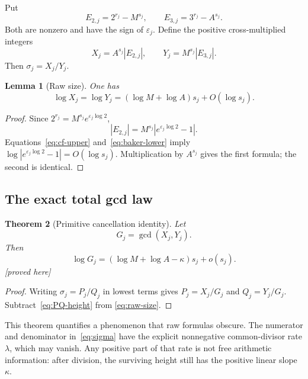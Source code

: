 \documentclass[11pt,oneside]{article}
\newtheorem{theorem}{Theorem}[section]
\newtheorem{lemma}[theorem]{Lemma}
\theoremstyle{definition}
\theoremstyle{remark}
\newcommand{\eps}{\varepsilon}
\newcommand{\proved}{\textcolor{deepgreen}{\textsf{[proved here]}}}
\begin{document}
Put
\begin{equation}
 E_{2,j}=2^{r_j}-M^{s_j},\qquad
 E_{3,j}=3^{r_j}-A^{s_j}.
 \label{eq:residuals}
\end{equation}
Both are nonzero and have the sign of $\eps_j$.  Define the positive cross-multiplied
integers
\begin{equation}
 X_j=A^{s_j}|E_{2,j}|,
 \qquad
 Y_j=M^{s_j}|E_{3,j}|.
 \label{eq:XY}
\end{equation}
Then $\sigma_j=X_j/Y_j$.

\begin{lemma}[Raw size]
\label{lem:raw-size}
One has
\begin{equation}
 \log X_j=\log Y_j=(\log M+\log A)s_j+O(\log s_j).
 \label{eq:raw-size}
\end{equation}
\end{lemma}

\begin{proof}
Since $2^{r_j}=M^{s_j}e^{\eps_j\log2}$,
\[
 |E_{2,j}|=M^{s_j}|e^{\eps_j\log2}-1|.
\]
Equations~\eqref{eq:cf-upper} and~\eqref{eq:baker-lower} imply
$\log|e^{\eps_j\log2}-1|=O(\log s_j)$.  Multiplication by $A^{s_j}$ gives the first formula;
the second is identical.
\end{proof}

\subsection{The exact total gcd law}

\begin{theorem}[Primitive cancellation identity]
\label{thm:total-gcd}
Let
\begin{equation}
 G_j=\gcd(X_j,Y_j).
 \label{eq:G}
\end{equation}
Then
\begin{equation}
 \boxed{
 \log G_j=(\log M+\log A-\kappa)s_j+o(s_j).}
 \label{eq:G-asymptotic}
\end{equation}
\proved
\end{theorem}

\begin{proof}
Writing $\sigma_j=P_j/Q_j$ in lowest terms gives
$P_j=X_j/G_j$ and $Q_j=Y_j/G_j$.  Subtract~\eqref{eq:PQ-height} from
\eqref{eq:raw-size}.
\end{proof}

This theorem quantifies a phenomenon that raw formulas obscure.  The numerator and
denominator in~\eqref{eq:sigma} have the explicit nonnegative common-divisor rate $\lambda$,
which may vanish.  Any positive part of that rate is not free arithmetic information: after
division, the surviving height still has the positive linear slope $\kappa$.
\end{document}
